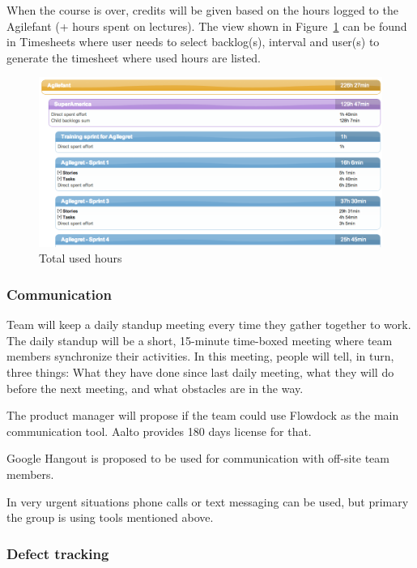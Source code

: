 When the course is over, credits will be given based on the hours logged to the 
Agilefant (+ hours spent on lectures). The view shown in 
Figure~\ref{fig:totalhours} can be found in Timesheets where user needs to 
select backlog(s), interval and user(s) to generate the timesheet where used 
hours are listed.

\begin{figure}[H]
\centering
\includegraphics[width=1\textwidth]{imgs/totalhours.png}
\caption{Total used hours}
\label{fig:totalhours}
\end{figure}

\subsubsection{Communication}

Team will keep a daily standup meeting every time they gather together to work. 
The daily standup will be a short, 15-minute time-boxed meeting where team 
members synchronize their activities. In this meeting, people will tell, in 
turn, three things: What they have done since last daily meeting, what they 
will do before the next meeting, and what obstacles are in the way.  

The product manager will propose if the team could use Flowdock as the main 
communication tool. Aalto provides 180 days license for that.

Google Hangout is proposed to be used for communication with off-site team 
members.

In very urgent situations phone calls or text messaging can be used, but 
primary the group is using tools mentioned above.

\subsubsection{Defect tracking}

